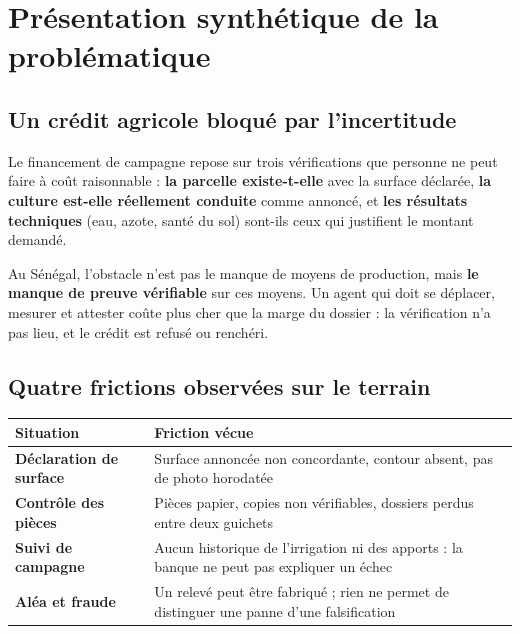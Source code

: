 \documentclass[12pt, a4paper]{article}
\begin{document}
\section{Présentation synthétique de la problématique}

\subsection{Un crédit agricole bloqué par l'incertitude}

Le financement de campagne repose sur trois vérifications que personne ne peut faire à
coût raisonnable : \textbf{la parcelle existe-t-elle} avec la surface déclarée,
\textbf{la culture est-elle réellement conduite} comme annoncé, et \textbf{les résultats
techniques} (eau, azote, santé du sol) sont-ils ceux qui justifient le montant demandé.

\begin{mdframed}[style=primary]
Au Sénégal, l'obstacle n'est pas le manque de moyens de production, mais \textbf{le manque
de preuve vérifiable} sur ces moyens. Un agent qui doit se déplacer, mesurer et attester
coûte plus cher que la marge du dossier : la vérification n'a pas lieu, et le crédit est
refusé ou renchéri.
\end{mdframed}

\subsection{Quatre frictions observées sur le terrain}

\begin{tabularx}{\linewidth}{>{\bfseries\color{primary}}l X}
  \toprule
  \rowcolor{lightbg}
  Situation & Friction vécue \\
  \midrule
  Déclaration de surface
    & Surface annoncée non concordante, contour absent, pas de photo horodatée \\
  \addlinespace
  Contrôle des pièces
    & Pièces papier, copies non vérifiables, dossiers perdus entre deux guichets \\
  \addlinespace
  Suivi de campagne
    & Aucun historique de l'irrigation ni des apports : la banque ne peut pas expliquer un échec \\
  \addlinespace
  Aléa et fraude
    & Un relevé peut être fabriqué ; rien ne permet de distinguer une panne d'une falsification \\
  \bottomrule
\end{tabularx}
\end{document}
